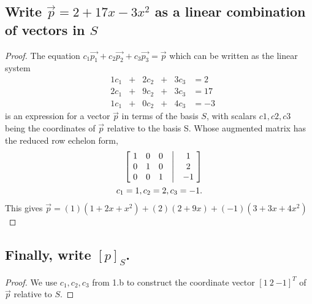 \documentclass[../main.tex]{subfiles}
\begin{document}
\subsection{Write $\vec{p} = 2 + 17x - 3x^2$ as a linear combination of vectors in $S$}
\begin{proof}
  The equation $c_{1}\vec{p_{1}} + c_{2}\vec{p_{2}} + c_{3}\vec{p_{3}} = \vec{p}$ which can be written as the linear system
  $$
    \begin{matrix}
       & 1c_{1} & + & 2c_{2} & + & 3c_{3} & = 2  \\
       & 2c_{1} & + & 9c_{2} & + & 3c_{3} & = 17 \\
       & 1c_{1} & + & 0c_{2} & + & 4c_{3} & = -3
    \end{matrix}
  $$
  is an expression for a vector $\vec{p}$ in terms of the basis $S$, with scalars $c1, c2, c3$
  being the coordinates of $\vec{p}$ relative to the basis S. Whose augmented matrix has the reduced row echelon form,
  \begin{align*}
    \begin{bmatrix}
      \ 1 & 0 & 0 & \bigm| & 1  \ \\
      \ 0 & 1 & 0 & \bigm| & 2  \ \\
      \ 0 & 0 & 1 & \bigm| & -1 \
    \end{bmatrix} \\
    c_{1} = 1, c_{2} = 2, c_{3} = -1.
  \end{align*}
  This gives $\vec{p} = (1)(1+2x+x^2) + (2)(2 + 9x) + (-1)(3 + 3x + 4x^2)$
\end{proof}
\subsection{Finally, write $[p]_S$.}
\begin{proof}
  We use $c_{1}, c_{2}, c_{3}$ from 1.b to construct the coordinate vector $[1\ 2\ {-1}]^{T}$ of $\vec{p}$ relative to $S$.
\end{proof}
\end{document}
